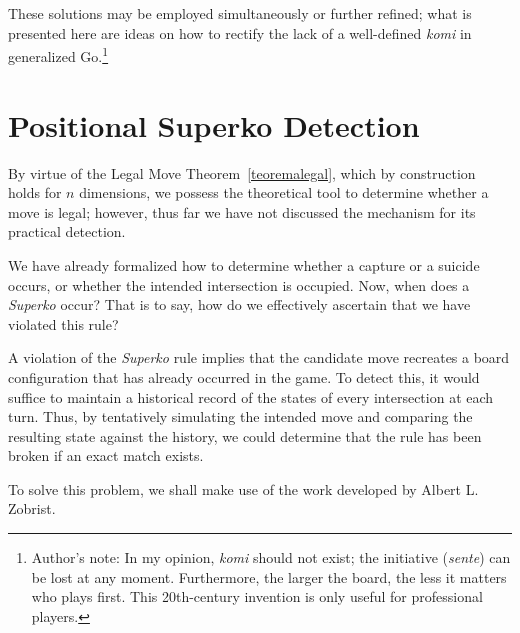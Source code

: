 These solutions may be employed simultaneously or further refined; what is presented here are ideas on how to rectify the lack of a well-defined \textit{komi} in generalized Go.\footnote{Author's note: In my opinion, \textit{komi} should not exist; the initiative (\textit{sente}) can be lost at any moment. Furthermore, the larger the board, the less it matters who plays first. This 20th-century invention is only useful for professional players.}

\section{Positional Superko Detection}\label{detec_superko}

By virtue of the Legal Move Theorem~\ref{teoremalegal}, which by construction holds for \(n\) dimensions, we possess the theoretical tool to determine whether a move is legal; however, thus far we have not discussed the mechanism for its practical detection.

We have already formalized how to determine whether a capture or a suicide occurs, or whether the intended intersection is occupied. Now, when does a \textit{Superko} occur? That is to say, how do we effectively ascertain that we have violated this rule?

A violation of the \textit{Superko} rule implies that the candidate move recreates a board configuration that has already occurred in the game. To detect this, it would suffice to maintain a historical record of the states of every intersection at each turn. Thus, by tentatively simulating the intended move and comparing the resulting state against the history, we could determine that the rule has been broken if an exact match exists.

To solve this problem, we shall make use of the work developed by Albert L. Zobrist\cite{zobrist1970hashing}.




